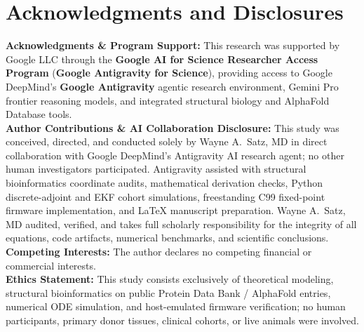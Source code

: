 \documentclass[11pt]{article}
\theoremstyle{plain}
\theoremstyle{remark}
\begin{document}
\section*{Acknowledgments and Disclosures}
\small
\noindent\textbf{Acknowledgments \& Program Support:} This research was supported by Google LLC through the \textbf{Google AI for Science Researcher Access Program} (\textbf{Google Antigravity for Science}), providing access to Google DeepMind's \textbf{Google Antigravity} agentic research environment, Gemini Pro frontier reasoning models, and integrated structural biology and AlphaFold Database tools.\\[3pt]
\noindent\textbf{Author Contributions \& AI Collaboration Disclosure:} This study was conceived, directed, and conducted solely by Wayne A.~Satz, MD in direct collaboration with Google DeepMind's Antigravity AI research agent; no other human investigators participated. Antigravity assisted with structural bioinformatics coordinate audits, mathematical derivation checks, Python discrete-adjoint and EKF cohort simulations, freestanding C99 fixed-point firmware implementation, and \LaTeX{} manuscript preparation. Wayne A.~Satz, MD audited, verified, and takes full scholarly responsibility for the integrity of all equations, code artifacts, numerical benchmarks, and scientific conclusions.\\[3pt]
\noindent\textbf{Competing Interests:} The author declares no competing financial or commercial interests.\\[3pt]
\noindent\textbf{Ethics Statement:} This study consists exclusively of theoretical modeling, structural bioinformatics on public Protein Data Bank / AlphaFold entries, numerical ODE simulation, and host-emulated firmware verification; no human participants, primary donor tissues, clinical cohorts, or live animals were involved.



\end{document}
